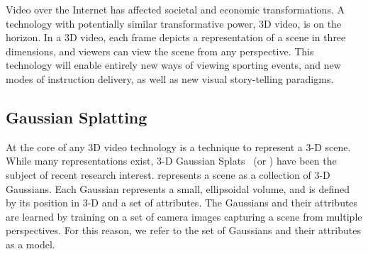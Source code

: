   

Video over the Internet has affected societal and economic transformations.
%
A technology with potentially similar transformative power, 3D video, is on the horizon.
%
In a 3D video, each frame depicts a representation of a scene in three dimensions, and viewers can view the scene from any perspective.
%
This technology will enable entirely new ways of viewing sporting events, and new modes of instruction delivery, as well as new visual story-telling paradigms.

\subsection{Gaussian Splatting}\label{sec:3d-gauss-splat}

%
At the core of any 3D video technology is a technique to represent a 3-D scene.
%
While many representations exist, 3-D Gaussian Splats~\cite{gsplat} (or \gs{}) have been the subject of recent research interest.
%
\gs{} represents a scene as a collection of 3-D Gaussians.
%
Each Gaussian represents a small, ellipsoidal volume, and is defined by its position in 3-D and a set of attributes.
%
The Gaussians and their attributes are learned by training on a set of camera images capturing a scene from multiple perspectives.
%
For this reason, we refer to the set of Gaussians and their attributes as a \gs{} model.

